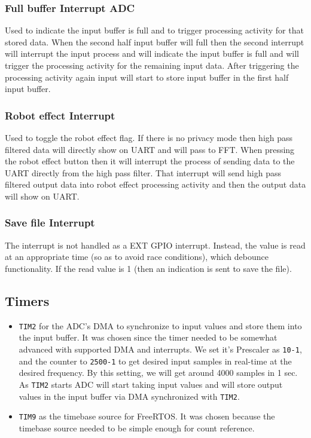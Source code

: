 \documentclass[11pt]{article}
\begin{document}
\subsubsection*{Full buffer Interrupt ADC}
\label{sec:org2edbc22}
Used to indicate the input buffer is full and to trigger processing activity for that stored data. When the second half input buffer will full then the second interrupt will interrupt the input process and will indicate the input buffer is full and will trigger the processing activity for the remaining input data.  After triggering the processing activity again input will start to store input buffer in the first half input buffer.
\subsubsection*{Robot effect Interrupt}
\label{sec:org3b85eec}
Used to toggle the robot effect flag. If there is no privacy mode then high pass filtered data will directly show on UART and will pass to FFT. When pressing the robot effect button then it will interrupt the process of sending data to the UART directly from the high pass filter. That interrupt will send high pass filtered output data into robot effect processing activity and then the output data will show on UART.
\subsubsection*{Save file Interrupt}
\label{sec:orge52fba7}
The interrupt is not handled as a EXT GPIO interrupt. Instead, the value is read at an appropriate time (so as to avoid race conditions), which debounce functionality. If the read value is 1 (then an indication is sent to save the file).

\subsection{Timers}
\label{sec:org7a9c2b4}

\begin{itemize}
\item \texttt{TIM2} for the ADC's DMA to synchronize to input values and store them into the input buffer. It was chosen since the timer needed to be somewhat advanced with supported DMA and interrupts. We set it's Prescaler as \texttt{10-1}, and the counter to \texttt{2500-1} to get desired input samples in real-time at the desired frequency. By this setting, we will get around 4000 samples in 1 sec. As \texttt{TIM2} starts ADC will start taking input values and will store output values in the input buffer via DMA synchronized with \texttt{TIM2}.
\item \texttt{TIM9} as the timebase source for FreeRTOS. It was chosen because the timebase source needed to be simple enough for count reference.
\end{itemize}
\end{document}
